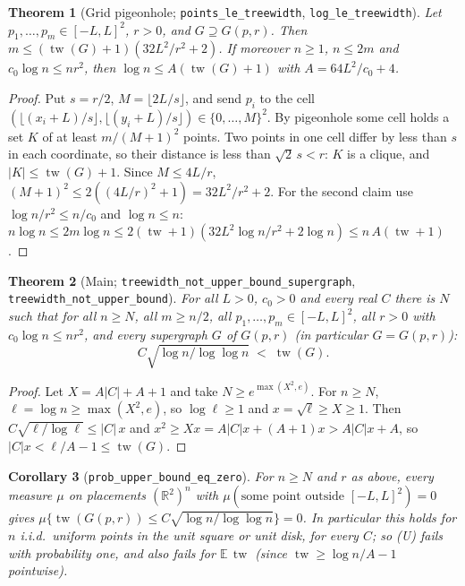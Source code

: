 \documentclass[11pt]{article}
\newtheorem{theorem}{Theorem}
\newtheorem{corollary}[theorem]{Corollary}
\theoremstyle{definition}
\theoremstyle{remark}
\newcommand{\tw}{\operatorname{tw}}
\begin{document}
\begin{theorem}[Grid pigeonhole; \texttt{points\_le\_treewidth}, \texttt{log\_le\_treewidth}]
Let $p_1,\dots,p_m\in[-L,L]^2$, $r>0$, and $G\supseteq G(p,r)$. Then
$m\le(\tw(G)+1)(32L^2/r^2+2)$. If moreover $n\ge1$, $n\le 2m$ and $c_0\log n\le nr^2$, then
$\log n\le A(\tw(G)+1)$ with $A=64L^2/c_0+4$.
\end{theorem}

\begin{proof}
Put $s=r/2$, $M=\lfloor 2L/s\rfloor$, and send $p_i$ to the cell
$(\lfloor (x_i+L)/s\rfloor,\lfloor (y_i+L)/s\rfloor)\in\{0,\dots,M\}^2$. By pigeonhole some cell
holds a set $K$ of at least $m/(M+1)^2$ points. Two points in one cell differ by less than $s$
in each coordinate, so their distance is less than $\sqrt2\,s<r$: $K$ is a clique, and
$|K|\le\tw(G)+1$. Since $M\le 4L/r$, $(M+1)^2\le 2((4L/r)^2+1)=32L^2/r^2+2$. For the second
claim use $\log n/r^2\le n/c_0$ and $\log n\le n$:
$n\log n\le 2m\log n\le 2(\tw+1)(32L^2\log n/r^2+2\log n)\le n\,A(\tw+1)$.
\end{proof}

\begin{theorem}[Main; \texttt{treewidth\_not\_upper\_bound\_supergraph},
\texttt{treewidth\_not\_upper\_bound}]
For all $L>0$, $c_0>0$ and every real $C$ there is $N$ such that for all $n\ge N$, all
$m\ge n/2$, all $p_1,\dots,p_m\in[-L,L]^2$, all $r>0$ with $c_0\log n\le nr^2$, and every
supergraph $G$ of $G(p,r)$ (in particular $G=G(p,r)$):
\[
  C\sqrt{\log n/\log\log n}\;<\;\tw(G).
\]
\end{theorem}

\begin{proof}
Let $X=A|C|+A+1$ and take $N\ge e^{\max(X^2,e)}$. For $n\ge N$, $\ell=\log n\ge\max(X^2,e)$, so
$\log\ell\ge1$ and $x=\sqrt\ell\ge X\ge1$. Then $C\sqrt{\ell/\log\ell}\le|C|\,x$ and
$x^2\ge Xx=A|C|x+(A+1)x>A|C|x+A$, so $|C|x<\ell/A-1\le\tw(G)$.
\end{proof}

\begin{corollary}[\texttt{prob\_upper\_bound\_eq\_zero}]
For $n\ge N$ and $r$ as above, every measure $\mu$ on placements $(\mathbb{R}^2)^n$ with
$\mu(\text{some point outside }[-L,L]^2)=0$ gives
$\mu\{\tw(G(p,r))\le C\sqrt{\log n/\log\log n}\}=0$. In particular this holds for $n$ i.i.d.\
uniform points in the unit square or unit disk, for every $C$; so (U) fails with probability
one, and also fails for $\mathbb{E}\,\tw$ (since $\tw\ge \log n/A-1$ pointwise).
\end{corollary}
\end{document}
